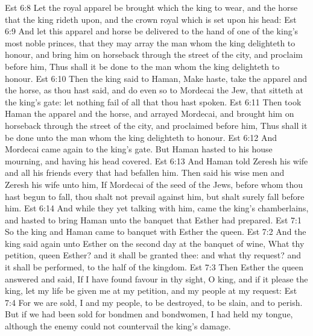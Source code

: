 \vs Est 6:8 Let the royal apparel be brought which the king  to wear, and the horse that the king rideth upon, and the crown royal which is set upon his head:
\vs Est 6:9 And let this apparel and horse be delivered to the hand of one of the king's most noble princes, that they may array the man  whom the king delighteth to honour, and bring him on horseback through the street of the city, and proclaim before him, Thus shall it be done to the man whom the king delighteth to honour.
\vs Est 6:10 Then the king said to Haman, Make haste,  take the apparel and the horse, as thou hast said, and do even so to Mordecai the Jew, that sitteth at the king's gate: let nothing fail of all that thou hast spoken.
\vs Est 6:11 Then took Haman the apparel and the horse, and arrayed Mordecai, and brought him on horseback through the street of the city, and proclaimed before him, Thus shall it be done unto the man whom the king delighteth to honour.
\vs Est 6:12 And Mordecai came again to the king's gate. But Haman hasted to his house mourning, and having his head covered.
\vs Est 6:13 And Haman told Zeresh his wife and all his friends every  that had befallen him. Then said his wise men and Zeresh his wife unto him, If Mordecai  of the seed of the Jews, before whom thou hast begun to fall, thou shalt not prevail against him, but shalt surely fall before him.
\vs Est 6:14 And while they  yet talking with him, came the king's chamberlains, and hasted to bring Haman unto the banquet that Esther had prepared.
\vs Est 7:1 So the king and Haman came to banquet with Esther the queen.
\vs Est 7:2 And the king said again unto Esther on the second day at the banquet of wine, What  thy petition, queen Esther? and it shall be granted thee: and what  thy request? and it shall be performed,  to the half of the kingdom.
\vs Est 7:3 Then Esther the queen answered and said, If I have found favour in thy sight, O king, and if it please the king, let my life be given me at my petition, and my people at my request:
\vs Est 7:4 For we are sold, I and my people, to be destroyed, to be slain, and to perish. But if we had been sold for bondmen and bondwomen, I had held my tongue, although the enemy could not countervail the king's damage.
